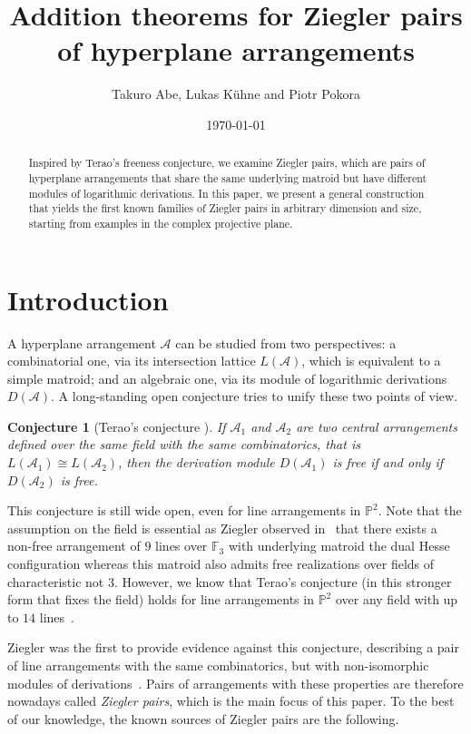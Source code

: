 \documentclass[a4paper,11pt]{amsart}
\title{Addition theorems for Ziegler pairs of hyperplane arrangements}
\author{Takuro Abe, Lukas K\"uhne and Piotr Pokora}
\date{\today}
\def\A{{\mathcal{A}}}%
\numberwithin{equation}{section}
\newtheorem{conj}[theorem]{Conjecture}
\theoremstyle{remark}
\begin{document}
\begin{abstract}
Inspired by Terao's freeness conjecture, we examine Ziegler pairs, which are pairs of hyperplane arrangements that share the same underlying matroid but have different modules of logarithmic derivations. In this paper, we present a general construction that yields the first known families of Ziegler pairs in arbitrary dimension and size, starting from examples in the complex projective plane.
\end{abstract}
\maketitle
\section{Introduction}

A hyperplane arrangement $\mathcal{A}$ can be studied from two perspectives: a combinatorial one, via its intersection lattice $L(\mathcal{A})$, which is equivalent to a simple matroid; and an algebraic one, via its module of logarithmic derivations $D(\mathcal{A})$. A long-standing open conjecture tries to unify these two points of view.

\begin{conj}[Terao's conjecture \cite{OT}]
	If $\A_1$ and $\A_2$ are two central arrangements defined over the same field with the same combinatorics, that is $L(\A_1)\cong L(\A_2)$, then the derivation module $D(\A_1)$ is free if and only if $D(\A_2)$ is free.
\end{conj}

This conjecture is still wide open, even for line arrangements in $\mathbb{P}^2$.
Note that the assumption on the field is essential as Ziegler observed in~\cite{Ziegler_Characteristic} that there exists a non-free arrangement of $9$ lines over $\mathbb{F}_3$ with underlying matroid the dual Hesse configuration whereas this matroid also admits free realizations over fields of characteristic not $3$.
However, we know that Terao's conjecture (in this stronger form that fixes the field) holds for line arrangements in $\mathbb{P}^2$ over any field with up to $14$ lines~\cite{Tearo14}.

Ziegler was the first to provide evidence against this conjecture, describing a pair of line arrangements with the same combinatorics, but with non-isomorphic modules of derivations~\cite{Ziegler}.
Pairs of arrangements with these properties are therefore nowadays called \emph{Ziegler pairs}, which is the main focus of this paper.
To the best of our knowledge, the known sources of Ziegler pairs are the following.
\end{document}
